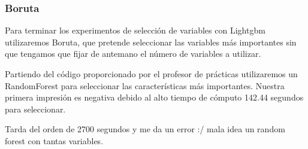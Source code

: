 \documentclass[a4paper, 20pt]{article}
\begin{document}
\subsubsection{Boruta}
Para terminar los experimentos de selección de variables con Lightgbm utilizaremos Boruta, que pretende seleccionar las variables más importantes sin que tengamos que fijar de antemano el número de variables a utilizar.

Partiendo del código proporcionado por el profesor de prácticas utilizaremos un RandomForest para seleccionar las características más importantes. Nuestra primera impresión es negativa debido al alto tiempo de cómputo 142.44 segundos para seleccionar.

Tarda del orden de 2700 segundos y me da un error :/ mala idea un random forest con tantas variables.

\printbibliography
\end{document}
